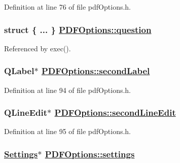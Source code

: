 Definition at line 76 of file pdf\-Options.h.\hypertarget{classPDFOptions_r13}{
\subsubsection[question]{\setlength{\rightskip}{0pt plus 5cm}struct \{ ... \}   \hyperlink{classPDFOptions_r13}{PDFOptions::question}}}
\label{classPDFOptions_r13}




Referenced by exec().\hypertarget{classPDFOptions_r51}{
\subsubsection[secondLabel]{\setlength{\rightskip}{0pt plus 5cm}QLabel$\ast$ \hyperlink{classPDFOptions_r51}{PDFOptions::second\-Label}}}
\label{classPDFOptions_r51}


Definition at line 94 of file pdf\-Options.h.\hypertarget{classPDFOptions_r52}{
\subsubsection[secondLineEdit]{\setlength{\rightskip}{0pt plus 5cm}QLine\-Edit$\ast$ \hyperlink{classPDFOptions_r52}{PDFOptions::second\-Line\-Edit}}}
\label{classPDFOptions_r52}


Definition at line 95 of file pdf\-Options.h.\hypertarget{classPDFOptions_r0}{
\subsubsection[settings]{\setlength{\rightskip}{0pt plus 5cm}\hyperlink{classSettings}{Settings}$\ast$ \hyperlink{classPDFOptions_r0}{PDFOptions::settings}}}
\label{classPDFOptions_r0}


